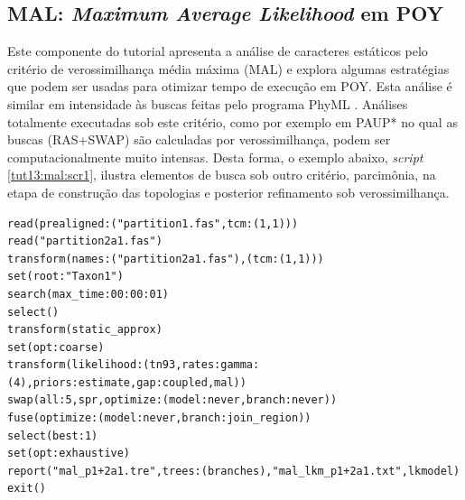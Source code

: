 \begin{refsection}

\subsection{\textbf{MAL}: \textit{Maximum Average Likelihood} em POY}\label{tut13:ml:mal}

Este componente do tutorial apresenta a análise de caracteres estáticos pelo critério de verossimilhança média máxima (MAL) e explora algumas estratégias que podem ser usadas para otimizar tempo de execução em POY. Esta análise é similar em intensidade às buscas feitas pelo programa PhyML \parencite{Guindon_et_al_2010}. Análises totalmente executadas sob este critério, como por exemplo em PAUP* \parencite{Swofford_2003} no qual as buscas (RAS+SWAP) são calculadas por verossimilhança, podem ser computacionalmente muito intensas. Desta forma, o exemplo abaixo, \textit{script} \ref{tut13:mal:scr1}, ilustra elementos de busca sob outro critério, parcimônia, na etapa de construção das topologias e posterior refinamento sob verossimilhança.

\scriptsize
\begin{lstlisting}[caption= conteúdo do arquivo mal\_part1+2a1.poy.,label=tut13:mal:scr1]
read(prealigned:("partition1.fas",tcm:(1,1)))
read("partition2a1.fas")
transform(names:("partition2a1.fas"),(tcm:(1,1)))
set(root:"Taxon1")
search(max_time:00:00:01)
select()
transform(static_approx)
set(opt:coarse)
transform(likelihood:(tn93,rates:gamma:(4),priors:estimate,gap:coupled,mal))
swap(all:5,spr,optimize:(model:never,branch:never))
fuse(optimize:(model:never,branch:join_region))
select(best:1)
set(opt:exhaustive)
report("mal_p1+2a1.tre",trees:(branches),"mal_lkm_p1+2a1.txt",lkmodel)
exit()
\end{lstlisting}
\normalsize


\end{refsection}
